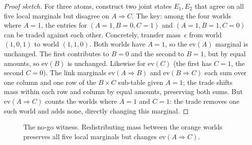 \documentclass[11pt,openany]{report}
\begin{document}
\begin{proof}[Proof sketch]
For three atoms, construct two joint states $E_1, E_2$ that agree on
all five local marginals but disagree on $A \Rightarrow C$.  The key:
among the four worlds where $A = 1$, the entries for
$(A\!=\!1, B\!=\!0, C\!=\!1)$ and $(A\!=\!1, B\!=\!1, C\!=\!0)$ can be
traded against each other.  Concretely, transfer mass~$\epsilon$
from world $(1,0,1)$ to world $(1,1,0)$.  Both worlds have $A = 1$,
so the $\mathrm{ev}(A)$ marginal is unchanged.  The first contributes
to $B\!=\!0$ and the second to $B\!=\!1$, but by equal amounts, so
$\mathrm{ev}(B)$ is unchanged.  Likewise for $\mathrm{ev}(C)$ (the
first has $C\!=\!1$, the second $C\!=\!0$).  The link marginals
$\mathrm{ev}(A\!\Rightarrow\!B)$ and $\mathrm{ev}(B\!\Rightarrow\!C)$
each sum over one column and one row of the $B \times C$ sub-table
given $A\!=\!1$; the trade shifts mass within each row and column by
equal amounts, preserving both sums.  But $\mathrm{ev}(A\!\Rightarrow\!C)$
counts the worlds where $A\!=\!1$ and $C\!=\!1$: the trade removes one
such world and adds none, directly changing this marginal.
\end{proof}

\begin{figure}[htbp]
\centering
{}
\caption{The no-go witness.  Redistributing mass between the orange
worlds preserves all five local marginals but changes
$\mathrm{ev}(A \Rightarrow C)$.}
\label{fig:no-go-witness}
\end{figure}
\end{document}
